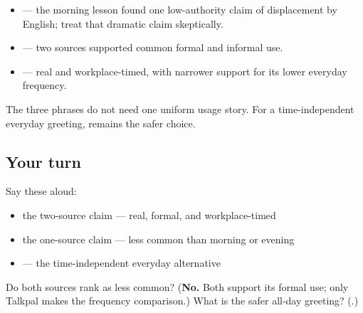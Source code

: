 \begin{culture}
\begin{itemize}
\raggedright
  \item \textbf{} — the morning lesson found one low-authority claim of displacement by English; treat that dramatic claim skeptically.
  \item \textbf{ } — two sources supported common formal and informal use.
  \item \textbf{ } — real and workplace-timed, with narrower support for its lower everyday frequency.
\end{itemize}

The three phrases do not need one uniform usage story. For a time-independent everyday greeting, \textbf{} remains the safer choice.
\end{culture}

\subsection*{Your turn}
Say these aloud:

\begin{itemize}
\raggedright
  \item the two-source claim — real, formal, and workplace-timed
  \item the one-source claim — less common than morning or evening
  \item {} — the time-independent everyday alternative
\end{itemize}

\begin{tcolorbox}[breakable,colback=teal!4,colframe=teal!35!black,title={Before you move on}]
Do both sources rank   as less common? (\textbf{No.} Both support its formal use; only Talkpal makes the frequency comparison.) What is the safer all-day greeting? (\textbf{}.)
\end{tcolorbox}
